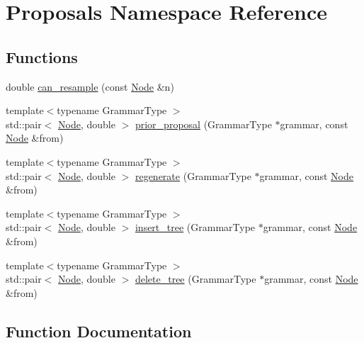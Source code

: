 \hypertarget{namespace_proposals}{}\section{Proposals Namespace Reference}
\label{namespace_proposals}
\subsection*{Functions}
\begin{DoxyCompactItemize}
\item 
double \hyperlink{namespace_proposals_a73f20ef1547bc5beef3e6e3adad2139c}{can\+\_\+resample} (const \hyperlink{class_node}{Node} \&n)
\item 
{\footnotesize template$<$typename Grammar\+Type $>$ }\\std\+::pair$<$ \hyperlink{class_node}{Node}, double $>$ \hyperlink{namespace_proposals_add01a544339cc3713d02f663c331f33b}{prior\+\_\+proposal} (Grammar\+Type $\ast$grammar, const \hyperlink{class_node}{Node} \&from)
\item 
{\footnotesize template$<$typename Grammar\+Type $>$ }\\std\+::pair$<$ \hyperlink{class_node}{Node}, double $>$ \hyperlink{namespace_proposals_aedcca10b4519a9aad7739878036019f3}{regenerate} (Grammar\+Type $\ast$grammar, const \hyperlink{class_node}{Node} \&from)
\item 
{\footnotesize template$<$typename Grammar\+Type $>$ }\\std\+::pair$<$ \hyperlink{class_node}{Node}, double $>$ \hyperlink{namespace_proposals_a8714ac1333d5aff2d248ef10a8eb5493}{insert\+\_\+tree} (Grammar\+Type $\ast$grammar, const \hyperlink{class_node}{Node} \&from)
\item 
{\footnotesize template$<$typename Grammar\+Type $>$ }\\std\+::pair$<$ \hyperlink{class_node}{Node}, double $>$ \hyperlink{namespace_proposals_a785ec0b4f2f5df9b78bbb8c0c5f16118}{delete\+\_\+tree} (Grammar\+Type $\ast$grammar, const \hyperlink{class_node}{Node} \&from)
\end{DoxyCompactItemize}


\subsection{Function Documentation}
\mbox{\label{namespace_proposals_a73f20ef1547bc5beef3e6e3adad2139c}} 
